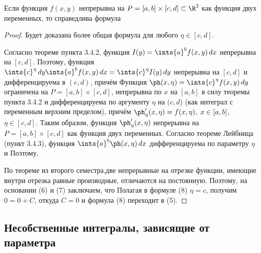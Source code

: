 \documentclass[a4paper]{article}
\begin{document}
\begin{theorem}
Если функция $f(x,y)$ непрерывна на $P=[a,b]\times[c,d]\subset\R^2$
как функция двух переменных, то справедлива формула
\end{theorem}

\begin{proof}
Будет доказана более общая формула 
для любого $\eta\in[c,d]$.

Согласно теореме пункта 3.4.2, функция $I(y) = \ints{a}^b
f(x,y)\,dx$ непрерывна на $[c,d]$. Поэтому, функция
$\ints{c}^{\eta}\,dy \ints{a}^b f(x,y)\,dx = \ints{c}^{\eta}
I(y)\,dy$ непрерывна на $[c,d]$ и дифференцируема в $(c,d)$, причём
Функция $\ph(x,\eta) = \ints{c}^{\eta} f(x,y)\,dy$ ограничена на
$P=[a,b]\times[c,d]$, непрерывна по $x$ на $[a,b]$ в силу теоремы
пункта 3.4.2 и дифференцируема по аргументу $\eta$ на $(c,d$) (как
интеграл с переменным верхним пределом), причём $\ph'_{\eta}(x,\eta)
= f(x,\eta), \; x\in[a,b]$, $\eta\in[c,d]$. Таким образом, функция
$\ph'_{\eta}(x,\eta)$ непрерывна на $P=[a,b]\times[c,d]$ как функция
двух переменных. Согласно теореме Лейбница (пункт 3.4.3), функция
$\ints{a}^b\ph(x,\eta)\,dx$ дифференцируема по параметру $\eta$ и
 Поэтому, 

По теореме из второго семестра,две непрерывные на отрезке функции,
имеющие внутри отрезка равные производные, отличаются на постоянную.
Поэтому, на основании (6) и (7) заключаем, что
 Полагая в формуле
(8) $\eta=c$, получим $0=0+C$, откуда $C=0$ и формула (8) переходит
в (5).
\end{proof}

\subsection{Несобственные интегралы, зависящие от параметра}
\end{document}
